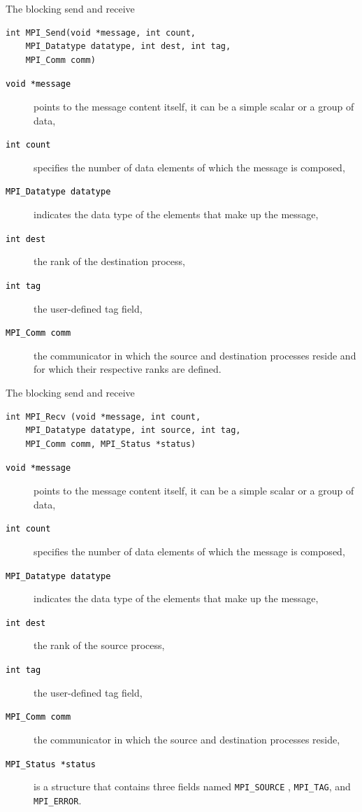 \documentclass[xcolor={svgnames,usenames}]{beamer}
\begin{document}
\begin{frame}[fragile]{The blocking send and receive}
\begin{verbatim}
int MPI_Send(void *message, int count, 
	MPI_Datatype datatype, int dest, int tag, 
	MPI_Comm comm)
\end{verbatim}
\begin{description}
	\item[\textcolor{black}{\texttt{void *message}}] points to the message content itself, it can be a simple scalar or a group of data,
	\item[\textcolor{black}{\texttt{int count}}] specifies the number of data elements of which the message is composed,
	\item[\textcolor{black}{\texttt{MPI_Datatype datatype}}] indicates the \alert{data type} of the elements that make up the message,
	\item[\textcolor{black}{\texttt{int dest}}] the rank of the destination process, 
	\item[\textcolor{black}{\texttt{int tag}}] the user-defined tag field, 
	\item[\textcolor{black}{\texttt{MPI_Comm comm}}] the communicator in which the source and destination processes reside and for which their respective
	ranks are defined.
\end{description}
\end{frame}

\begin{frame}[fragile]{The blocking send and receive}
\begin{verbatim}
int MPI_Recv (void *message, int count, 
	MPI_Datatype datatype, int source, int tag,
	MPI_Comm comm, MPI_Status *status)
\end{verbatim}
\begin{description}
	\item[\textcolor{black}{\texttt{void *message}}] points to the message content itself, it can be a simple scalar or a group of data,
	\item[\textcolor{black}{\texttt{int count}}] specifies the number of data elements of which the message is composed,
	\item[\textcolor{black}{\texttt{MPI_Datatype datatype}}] indicates the \alert{data type} of the elements that make up the message,
	\item[\textcolor{black}{\texttt{int dest}}] the rank of the source process, 
	\item[\textcolor{black}{\texttt{int tag}}] the user-defined tag field, 
	\item[\textcolor{black}{\texttt{MPI_Comm comm}}] the communicator in which the source and destination processes reside,
	\item[\textcolor{black}{\texttt{MPI_Status *status}}] is a structure that contains three fields named \texttt{MPI_SOURCE} , \texttt{MPI_TAG}, and \texttt{MPI_ERROR}.
\end{description}
\end{frame}
\end{document}

